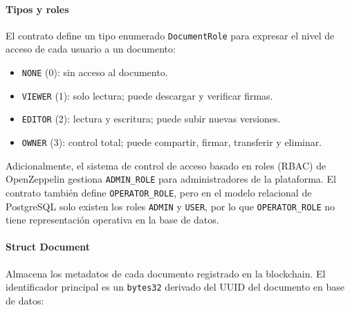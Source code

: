 \documentclass[11pt, a4paper]{article}
\begin{document}
\paragraph{Tipos y roles}

El contrato define un tipo enumerado \texttt{DocumentRole} para expresar el nivel de acceso de cada usuario a un documento:

\begin{itemize}
    \item \texttt{NONE} (0): sin acceso al documento.
    \item \texttt{VIEWER} (1): solo lectura; puede descargar y verificar firmas.
    \item \texttt{EDITOR} (2): lectura y escritura; puede subir nuevas versiones.
    \item \texttt{OWNER} (3): control total; puede compartir, firmar, transferir y eliminar.
\end{itemize}

Adicionalmente, el sistema de control de acceso basado en roles (RBAC) de OpenZeppelin gestiona \texttt{ADMIN\_ROLE} para administradores de la plataforma. El contrato también define \texttt{OPERATOR\_ROLE}, pero en el modelo relacional de PostgreSQL solo existen los roles \texttt{ADMIN} y \texttt{USER}, por lo que \texttt{OPERATOR\_ROLE} no tiene representación operativa en la base de datos.

\paragraph{Struct Document}

Almacena los metadatos de cada documento registrado en la blockchain. El identificador principal es un \texttt{bytes32} derivado del UUID del documento en base de datos:
\end{document}
